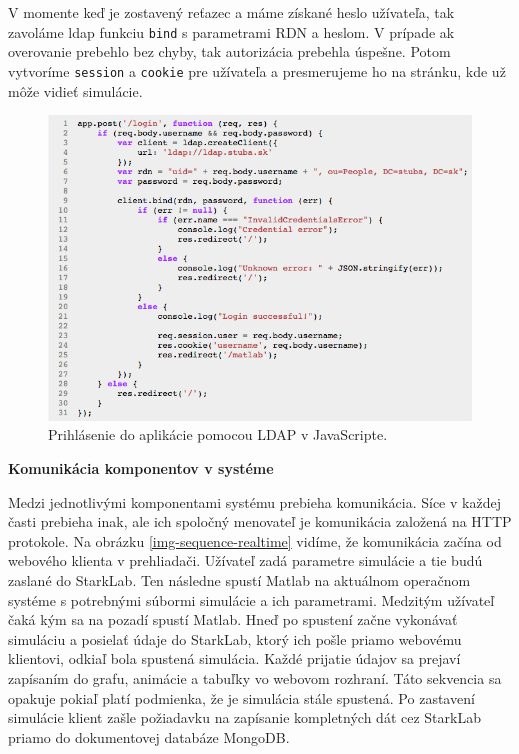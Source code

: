 V momente keď je zostavený reťazec a máme získané heslo užívateľa, tak zavoláme ldap funkciu \verb|bind| s parametrami RDN a heslom. V prípade ak overovanie prebehlo bez chyby, tak autorizácia prebehla úspešne. Potom vytvoríme \verb|session| a \verb|cookie| pre užívateľa a presmerujeme ho na stránku, kde už môže vidieť simulácie.

\begin{figure}[H]
  \centering
  \includegraphics[scale=0.7]{img/code/ldap-login.png}
  \caption{Prihlásenie do aplikácie pomocou LDAP v JavaScripte.}
  \label{img-sequence-ldap-login-js}
\end{figure}

\noindent \textbf{Komunikácia komponentov v systéme}

Medzi jednotlivými komponentami systému prebieha komunikácia. Síce v každej časti prebieha inak, ale ich spoločný menovateľ je komunikácia založená na HTTP protokole. Na obrázku \ref{img-sequence-realtime} vidíme, že komunikácia začína od webového klienta v prehliadači. Užívateľ zadá parametre simulácie a tie budú zaslané do StarkLab. Ten následne spustí Matlab na aktuálnom operačnom systéme s potrebnými súbormi simulácie a ich parametrami. Medzitým užívateľ čaká kým sa na pozadí spustí Matlab. Hneď po spustení začne vykonávať simuláciu a posielať údaje do StarkLab, ktorý ich pošle priamo webovému klientovi, odkiaľ bola spustená simulácia. Každé prijatie údajov sa prejaví zapísaním do grafu, animácie a tabuľky vo webovom rozhraní. Táto sekvencia sa opakuje pokiaľ platí podmienka, že je simulácia stále spustená. Po zastavení simulácie klient zašle požiadavku na zapísanie kompletných dát cez StarkLab priamo do dokumentovej databáze MongoDB.

